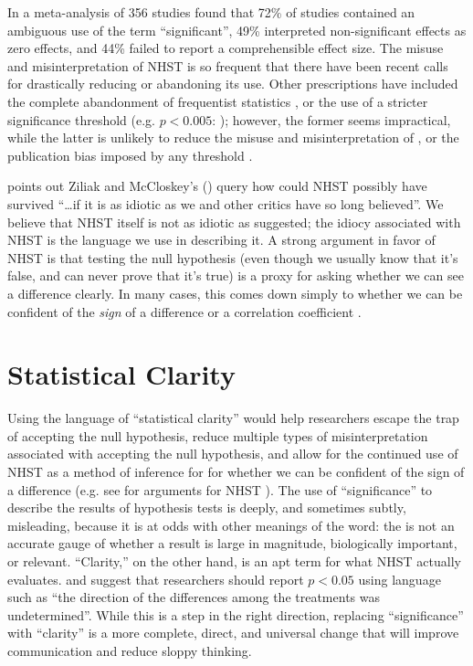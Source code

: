 In a meta-analysis of 356 studies \citet{Bernardietal.2017} found that 72\% of studies contained an ambiguous use of the term ``significant'', 49\% interpreted non-significant effects as zero effects, and 44\% failed to report a comprehensible effect size. The misuse and misinterpretation of NHST is so frequent that there have been recent calls for drastically reducing \citep{SzucsandIoannidis2017} or abandoning \citep{McShaneetal.2017} its use. Other prescriptions have included the complete abandonment of frequentist statistics , or the use of a stricter significance threshold (e.g. $p < 0.005$: \citealt{Benjaminetal.2018}); however, the former seems impractical, while the latter is unlikely to reduce the misuse and misinterpretation of \pvals, or the publication bias imposed by any \pval threshold \citep{Ridleyetal.2007}.

\citet{Kramer2011} points out Ziliak and McCloskey's (\citeyear{ZiliakandMcCloskey2008}) query how could NHST possibly have survived ``\ldots if it is as idiotic as we and other critics have so long believed''. We believe that NHST itself  is not as idiotic as suggested; the idiocy associated with NHST is the language we use in describing it. A strong argument in favor of NHST is that testing the null hypothesis (even though we usually know that it's false, and can never prove that it's true) is a proxy for asking whether we can see a difference clearly. In many cases, this comes down simply to whether we can be confident of the \emph{sign} of a difference or a correlation coefficient \citep{robinson2001past}. 

\section*{Statistical Clarity}

Using the language of ``statistical clarity'' would help researchers escape the trap of accepting the null hypothesis, reduce multiple types of misinterpretation associated with accepting the null hypothesis, and allow for the continued use of NHST as a method of inference for for whether we can be confident of the sign of a difference (e.g. see \citealt{Abelson1997} for arguments for NHST ). The use of ``significance'' to describe the results of hypothesis tests is deeply, and sometimes subtly, misleading, because it is at odds with other meanings of the word: the \pval is not an accurate gauge of whether a result is large in magnitude, biologically important, or relevant. ``Clarity,'' on the other hand, is an apt term for what NHST actually evaluates. \citet{jones2000sensible} and \citet{robinson2001past} suggest that researchers should report $p < 0.05$ using language such as ``the direction of the differences among the treatments was undetermined''. While this is a step in the right direction, replacing ``significance'' with ``clarity'' is a more complete, direct, and universal change that will improve communication and reduce sloppy thinking.

